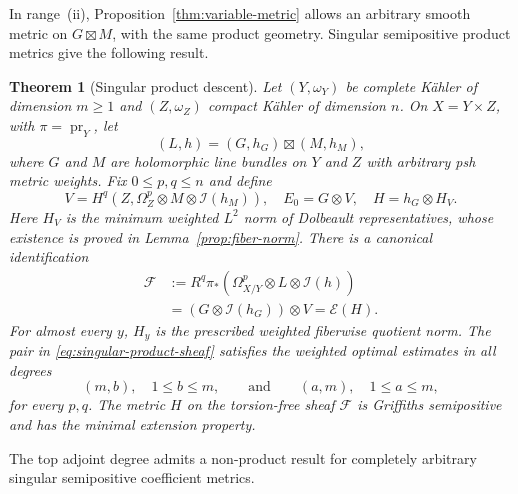 \documentclass[11pt,reqno]{amsart}
\numberwithin{equation}{section}
\newtheorem{theorem}{Theorem}[section]
\theoremstyle{definition}
\theoremstyle{remark}
\begin{document}
In range~\textnormal{(ii)}, Proposition~\ref{thm:variable-metric}
allows an arbitrary smooth metric on $G\boxtimes M$, with the same
product geometry.  Singular semipositive product metrics give
the following result.

\begin{theorem}[Singular product descent]\label{thm:singular-product}
Let $(Y,\omega_Y)$ be complete K\"ahler of dimension $m\ge1$
and $(Z,\omega_Z)$ compact K\"ahler of dimension $n$.  On $X=Y\times Z$, with $\pi=\operatorname{pr}_Y$, let
\[
 (L,h)=(G,h_G)\boxtimes(M,h_M),
\]
where $G$ and $M$ are holomorphic line bundles on $Y$ and $Z$
with arbitrary psh metric weights.  Fix $0\le p,q\le n$ and define
\[
 V=H^q(Z,\Omega_Z^p\otimes M\otimes\mathcal I(h_M)),\quad
 E_0=G\otimes V,\quad H=h_G\otimes H_V.
\]
Here $H_V$ is the minimum weighted $L^2$ norm of Dolbeault
representatives, whose existence is proved in
Lemma~\ref{prop:fiber-norm}.  There is a canonical identification
\begin{equation}\label{eq:singular-product-sheaf}
 \begin{aligned}
 \mathcal F&:=R^q\pi_*(\Omega_{X/Y}^p\otimes L\otimes\mathcal I(h))\\
  &=(G\otimes\mathcal I(h_G))\otimes V=\mathscr E(H).
 \end{aligned}
\end{equation}
For almost every $y$, $H_y$ is the prescribed weighted fiberwise
quotient norm.  The pair in \eqref{eq:singular-product-sheaf}
satisfies the weighted optimal estimates in all degrees
\[
 (m,b),\quad1\le b\le m,\qquad\text{and}\qquad
 (a,m),\quad1\le a\le m,
\]
for every $p,q$.  The metric $H$ on the torsion-free sheaf
$\mathcal F$ is Griffiths semipositive and has the minimal extension
property.
\end{theorem}

The top adjoint degree admits a non-product result for completely
arbitrary singular semipositive coefficient metrics.
\end{document}
